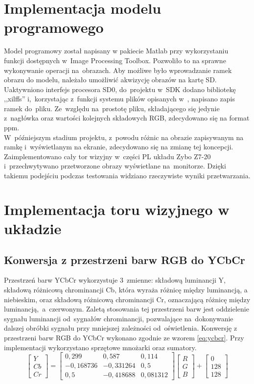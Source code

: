 \section{Implementacja modelu programowego}
\label{sec:Implementacja modelu programowego}
Model programowy został napisany w pakiecie Matlab przy wykorzystaniu funkcji dostępnych w~Image Processing Toolbox. Pozwoliło to na sprawne wykonywanie operacji na~obrazach.
Aby możliwe było wprowadzanie ramek obrazu do modelu, należało umożliwić akwizycję obrazów na kartę SD. Uaktywniono interfejs procesora SD0, do~projektu w~SDK dodano bibliotekę ,,xilffs'' i,~korzystając z~funkcji systemu plików opisanych w~\cite{xilffs}, napisano zapis ramek do~pliku. Ze~względu na~prostotę pliku, składającego się jedynie z~nagłówka oraz wartości kolejnych składowych RGB, zdecydowano się na format ppm.\\
W~późniejszym stadium projektu, z~powodu różnic na obrazie zapisywanym na ramkę i~wyświetlanym na ekranie, zdecydowano się na zmianę tej koncepcji. Zaimplementowano cały tor wizyjny w~części PL układu Zybo Z7-20 i~przechwytywano przetworzone obrazy wyświetlane na~monitorze. Dzięki takiemu podejściu podczas testowania widziano rzeczywiste wyniki przetwarzania.
\section{Implementacja toru wizyjnego w układzie}
\label{sec:impl_tor_wizyjny}
\subsection{Konwersja z przestrzeni barw RGB do YCbCr}
\label{subsec:konwersja}
Przestrzeń barw YCbCr wykorzystuje 3~zmienne: składową luminancji Y, składową różnicową chrominancji Cb, która wyraża różnicę między luminancją, a niebieskim, oraz składową różnicową chrominancji Cr, oznaczającą różnicę między luminancją,~a~czerwonym. Zaletą stosowania tej przestrzeni barw jest oddzielenie sygnału luminancji od~sygnałów chrominancji, pozwalające na~dokonywanie dalszej obróbki sygnału przy mniejszej zależności od~oświetlenia.
Konwersję z przestrzeni barw RGB do YCbCr wykonano zgodnie ze wzorem \ref{eq:ycbcr}. Przy implementacji wykorzystano sprzętowe mnożarki oraz sumatory.
\begin{equation}
\label{eq:ycbcr}
\begin{bmatrix} Y \\ 
				Cb\\
				Cr
\end{bmatrix}=
\begin{bmatrix} 0,299 & 0,587 & 0,114\\ 
				-0,168736 & -0,331264 & 0,5\\
				0,5 & -0,418688 & 0,081312
\end{bmatrix}
\begin{bmatrix} R\\
				G\\
				B
\end{bmatrix}+
\begin{bmatrix} 0\\
				128\\
				128
\end{bmatrix}
\end{equation}
